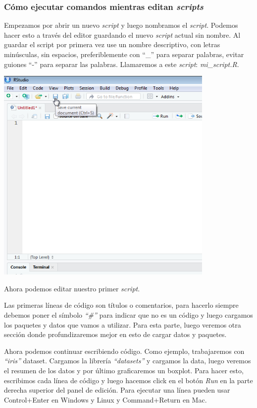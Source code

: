 \documentclass[
]{book}
\begin{document}
\subsubsection{\texorpdfstring{Cómo ejecutar comandos mientras editan \emph{scripts}}{Cómo ejecutar comandos mientras editan scripts}}\label{cuxf3mo-ejecutar-comandos-mientras-editan-scripts}

Empezamos por abrir un nuevo \emph{script} y luego nombramos el \emph{script}.
Podemos hacer esto a través del editor guardando el nuevo \emph{script} actual sin nombre.
Al guardar el script por primera vez use un nombre descriptivo, con letras minúsculas, sin espacios, preferiblemente con ``\_'' para separar palabras, evitar guiones ``-'' para separar las palabras.
Llamaremos a este \emph{script}: \emph{mi\_script.R}.\\

\begin{center}\includegraphics[width=300pt]{images/save} \end{center}

Ahora podemos editar nuestro primer \emph{script}.

Las primeras líneas de código son títulos o comentarios, para hacerlo siempre debemos poner el símbolo \emph{``\#''} para indicar que no es un código y luego cargamos los paquetes y datos que vamos a utilizar.
Para esta parte, luego veremos otra sección donde profundizaremos mejor en esto de cargar datos y paquetes.

Ahora podemos continuar escribiendo código.
Como ejemplo, trabajaremos con \emph{``iris''} dataset.
Cargamos la librería \emph{``datasets''} y cargamos la data, luego veremos el resumen de los datos y por último graficaremos un boxplot.
Para hacer esto, escribimos cada línea de código y luego hacemos click en el botón \emph{Run} en la parte derecha superior del panel de edición.
Para ejecutar una línea pueden usar Control+Enter en Windows y Linux y Command+Return en Mac.
\end{document}
